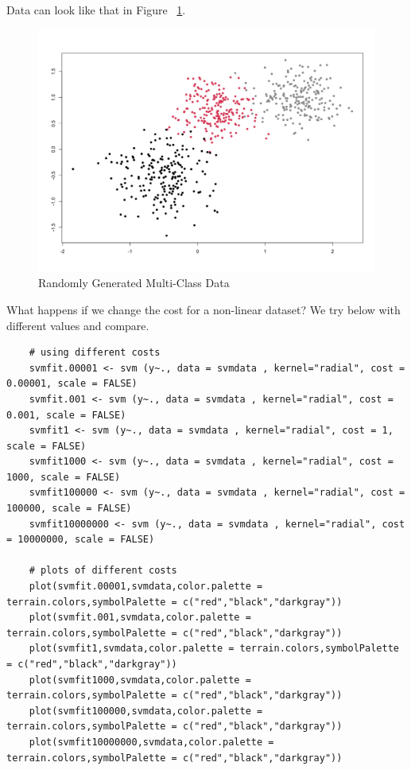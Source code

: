 \documentclass[12pt]{article}
\begin{document}
Data can look like that in Figure ~\ref{fig_svm_randomly_generated_data}.

\begin{figure}[ht]
    \centering
    \includegraphics[width=5in]{Figures/svm/svm_randomly_generated_data.png}
    \caption{Randomly Generated Multi-Class Data}
    \label{fig_svm_randomly_generated_data}
\end{figure}

What happens if we change the cost for a non-linear dataset? We try below with different values and compare.

\begin{verbatim}
    # using different costs
    svmfit.00001 <- svm (y~., data = svmdata , kernel="radial", cost = 0.00001, scale = FALSE)
    svmfit.001 <- svm (y~., data = svmdata , kernel="radial", cost = 0.001, scale = FALSE)
    svmfit1 <- svm (y~., data = svmdata , kernel="radial", cost = 1, scale = FALSE)
    svmfit1000 <- svm (y~., data = svmdata , kernel="radial", cost = 1000, scale = FALSE)
    svmfit100000 <- svm (y~., data = svmdata , kernel="radial", cost = 100000, scale = FALSE)
    svmfit10000000 <- svm (y~., data = svmdata , kernel="radial", cost = 10000000, scale = FALSE)
    
    # plots of different costs
    plot(svmfit.00001,svmdata,color.palette = terrain.colors,symbolPalette = c("red","black","darkgray"))
    plot(svmfit.001,svmdata,color.palette = terrain.colors,symbolPalette = c("red","black","darkgray"))
    plot(svmfit1,svmdata,color.palette = terrain.colors,symbolPalette = c("red","black","darkgray"))
    plot(svmfit1000,svmdata,color.palette = terrain.colors,symbolPalette = c("red","black","darkgray"))
    plot(svmfit100000,svmdata,color.palette = terrain.colors,symbolPalette = c("red","black","darkgray"))
    plot(svmfit10000000,svmdata,color.palette = terrain.colors,symbolPalette = c("red","black","darkgray"))    
\end{verbatim}
\end{document}
